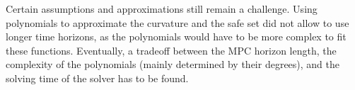 Certain assumptions and approximations still remain a challenge. Using polynomials to approximate the curvature and the safe set did not allow to use longer time horizons, as the polynomials would have to be more complex to fit these functions. Eventually, a tradeoff between the MPC horizon length, the complexity of the polynomials (mainly determined by their degrees), and the solving time of the solver has to be found.

